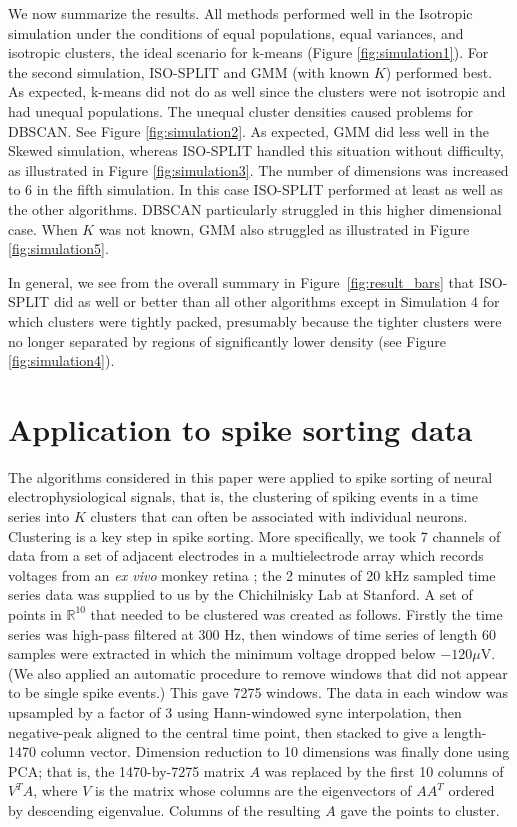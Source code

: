 \documentclass[10pt]{article}
\begin{document}
We now summarize the results.
 All methods performed well in the Isotropic simulation under the conditions of equal populations, equal variances, and isotropic clusters, the ideal scenario for k-means (Figure \ref{fig:simulation1}).
For the second simulation, ISO-SPLIT and GMM (with known $K$) performed best. As expected, k-means did not do as well since the clusters were not isotropic and had unequal populations. The unequal cluster densities caused problems for DBSCAN. See Figure \ref{fig:simulation2}.
As expected, GMM did less well in the Skewed simulation, whereas ISO-SPLIT handled this situation without difficulty, as illustrated in Figure \ref{fig:simulation3}.
The number of dimensions was increased to $6$ in the fifth simulation. In this case ISO-SPLIT performed at least as well as the other algorithms. DBSCAN particularly struggled in this higher dimensional case. When $K$ was not known, GMM also struggled as illustrated in Figure \ref{fig:simulation5}.

In general, we see from the overall summary in Figure~\ref{fig:result_bars} that ISO-SPLIT did as well or better than all other algorithms except in Simulation 4 for which clusters were tightly packed, presumably because the tighter clusters were no longer separated by regions of significantly lower density (see Figure \ref{fig:simulation4}).

\section {Application to spike sorting data}
\label{s:spike}

The algorithms considered in this paper were applied to spike sorting of neural electrophysiological signals, that is, the clustering of spiking events in a time series into $K$ clusters that can often be associated with individual neurons. Clustering is a key step in spike sorting. More specifically, we took 7 channels of data from a set of adjacent electrodes in a multielectrode array which records voltages from an {\em ex vivo} monkey retina \cite{litke}; the 2 minutes of 20 kHz sampled time series data was supplied to us by the Chichilnisky Lab at Stanford. A set of points in $\mathbb{R}^{10}$ that needed to be clustered was created as follows. Firstly the time series was high-pass filtered at 300 Hz, then windows of time series of length 60 samples were extracted in which the minimum voltage dropped below $-120 \mu$V. (We also applied an automatic procedure to remove windows that did not appear to be single spike events.) This gave 7275 windows. The data in each window was upsampled by a factor of 3 using Hann-windowed sync interpolation, then negative-peak aligned to the central time point, then stacked to give a length-1470 column vector. Dimension reduction to 10 dimensions was finally done using PCA; that is, the 1470-by-7275 matrix $A$ was replaced by the first 10 columns of $V^T A$, where $V$ is the matrix whose columns are the eigenvectors of $AA^T$ ordered by descending eigenvalue. Columns of the resulting $A$ gave the points to cluster.
\end{document}
